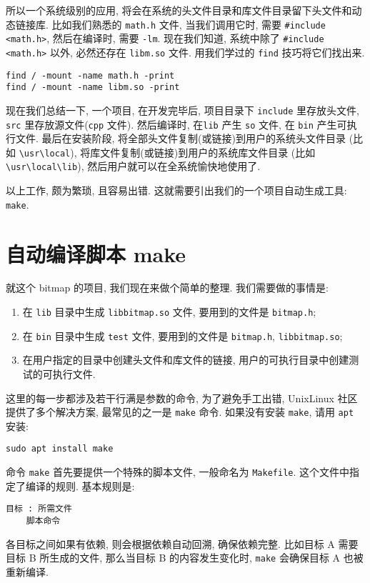\documentclass[a4paper]{ctexart}
\begin{document}
所以一个系统级别的应用, 将会在系统的头文件目录和库文件目录留下头文件和动态链接库.
比如我们熟悉的 \verb|math.h| 文件, 当我们调用它时, 需要 \verb|#include <math.h>|,
然后在编译时, 需要 \verb|-lm|. 现在我们知道, 系统中除了 \verb|#include <math.h>| 以外,
必然还存在 \verb|libm.so| 文件. 用我们学过的 \verb|find| 技巧将它们找出来.
\begin{verbatim}
find / -mount -name math.h -print
find / -mount -name libm.so -print
\end{verbatim}

现在我们总结一下, 一个项目, 在开发完毕后, 项目目录下 \verb|include| 里存放头文件,
\verb|src| 里存放源文件(\verb|cpp| 文件). 然后编译时, 在\verb|lib| 产生 \verb|so| 文件,
在 \verb|bin| 产生可执行文件. 最后在安装阶段, 将全部头文件复制(或链接)到用户的系统头文件目录
(比如 \verb|\usr\local|), 将库文件复制(或链接)到用户的系统库文件目录
(比如 \verb|\usr\local\lib|), 然后用户就可以在全系统愉快地使用了.

以上工作, 颇为繁琐, 且容易出错. 这就需要引出我们的一个项目自动生成工具: \verb|make|.

\section{自动编译脚本 make}

就这个 bitmap 的项目, 我们现在来做个简单的整理. 我们需要做的事情是:

\begin{enumerate}
\item 在 \verb|lib| 目录中生成 \verb|libbitmap.so| 文件,
  要用到的文件是 \verb|bitmap.h|;
\item 在 \verb|bin| 目录中生成 \verb|test| 文件,
  要用到的文件是 \verb|bitmap.h|, \verb|libbitmap.so|;
\item 在用户指定的目录中创建头文件和库文件的链接,
  用户的可执行目录中创建测试的可执行文件. 
\end{enumerate}

这里的每一步都涉及若干行满是参数的命令, 为了避免手工出错,
Unix\/Linux 社区提供了多个解决方案, 最常见的之一是 \verb|make| 命令.
如果没有安装 \verb|make|, 请用 \verb|apt| 安装:
\begin{verbatim}
sudo apt install make
\end{verbatim}

命令 \verb|make| 首先要提供一个特殊的脚本文件, 一般命名为 \verb|Makefile|.
这个文件中指定了编译的规则. 基本规则是:
\begin{verbatim}
目标 : 所需文件
    脚本命令
\end{verbatim}
各目标之间如果有依赖, 则会根据依赖自动回溯, 确保依赖完整. 比如目标 A 需要目标 B 所生成的文件,
那么当目标 B 的内容发生变化时, \verb|make| 会确保目标 A 也被重新编译.
\end{document}
